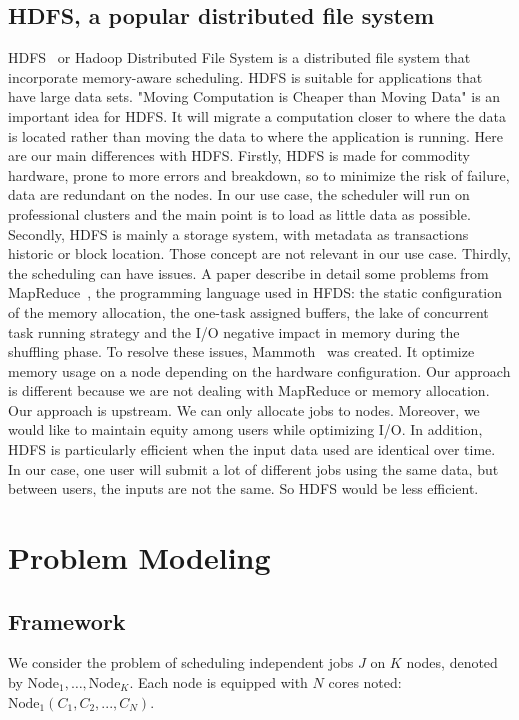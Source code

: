 \documentclass[a4paper]{article}
\newcommand{\Node}[1]{\ensuremath{\mathrm{Node}_{#1}}\xspace}
\begin{document}
\subsection{HDFS, a popular distributed file system}
HDFS~\cite{hdfs} or Hadoop Distributed File System is a distributed file system that incorporate memory-aware scheduling.
HDFS is suitable for applications that have large data sets. 
"Moving Computation is Cheaper than Moving Data" is an important idea for HDFS.
It will migrate a computation closer to where the data is located rather than moving the data to where
the application is running.
Here are our main differences with HDFS. Firstly, HDFS is made for commodity hardware, prone
to more errors and breakdown, so to minimize the risk of failure, data are redundant on the nodes.
In our use case, the scheduler will run on professional clusters and the main point is to load as 
little data as possible. Secondly, HDFS is mainly a storage system, with metadata as transactions historic or
block location. Those concept are not relevant in our use case. Thirdly, the scheduling 
can have issues. A paper describe in detail some problems from MapReduce~\cite{issue_with_hdfs}, the
programming language used in HFDS: the static configuration of the memory allocation, the one-task assigned buffers, the
lake of concurrent task running strategy and the I/O negative impact in memory during the shuffling phase.
To resolve these issues, Mammoth~\cite{Mammoth} was created. It optimize memory usage on a node depending on the hardware configuration.
Our approach is different because we are not dealing with MapReduce or memory allocation.
Our approach is upstream. We can only allocate jobs to nodes. Moreover, we would like to maintain
equity among users  while optimizing I/O.
In addition, HDFS is particularly efficient when the input data used are identical over time.
In our case, one user will submit a lot of different jobs using the same data, but between users,
the inputs are not the same. So HDFS would be less efficient.


\section{Problem Modeling}

\subsection{Framework}
We consider the problem of scheduling independent jobs $J$ on $K$ nodes,
denoted by $\Node{1},\ldots, \Node{K}$.
Each node is equipped with $N$ cores noted: $\Node{1}(C_1, C_2, ..., C_{N})$.
\end{document}
